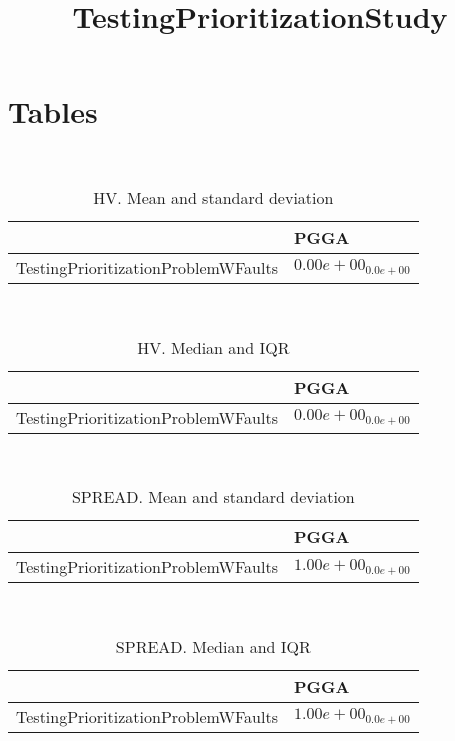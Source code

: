 \documentclass{article}
\title{TestingPrioritizationStudy}
\author{}
\begin{document}
\maketitle
\section{Tables}
\
\begin{table}
\caption{HV. Mean and standard deviation}
\label{table:mean.HV}
\centering
\begin{scriptsize}
\begin{tabular}{ll}
\hline &  PGGA\\
\hline
TestingPrioritizationProblemWFaults & $  0.00e+00_{ 0.0e+00}$ \\
\hline
\end{tabular}
\end{scriptsize}
\end{table}
\
\begin{table}
\caption{HV. Median and IQR}
\label{table:median.HV}
\begin{scriptsize}
\centering
\begin{tabular}{ll}
\hline &  PGGA\\
\hline
TestingPrioritizationProblemWFaults & $  0.00e+00_{ 0.0e+00}$ \\
\hline
\end{tabular}
\end{scriptsize}
\end{table}
\
\begin{table}
\caption{SPREAD. Mean and standard deviation}
\label{table:mean.SPREAD}
\centering
\begin{scriptsize}
\begin{tabular}{ll}
\hline &  PGGA\\
\hline
TestingPrioritizationProblemWFaults & \cellcolor{gray95}$  1.00e+00_{ 0.0e+00}$ \\
\hline
\end{tabular}
\end{scriptsize}
\end{table}
\
\begin{table}
\caption{SPREAD. Median and IQR}
\label{table:median.SPREAD}
\begin{scriptsize}
\centering
\begin{tabular}{ll}
\hline &  PGGA\\
\hline
TestingPrioritizationProblemWFaults & \cellcolor{gray95}$  1.00e+00_{ 0.0e+00}$ \\
\hline
\end{tabular}
\end{scriptsize}
\end{table}
\end{document}
